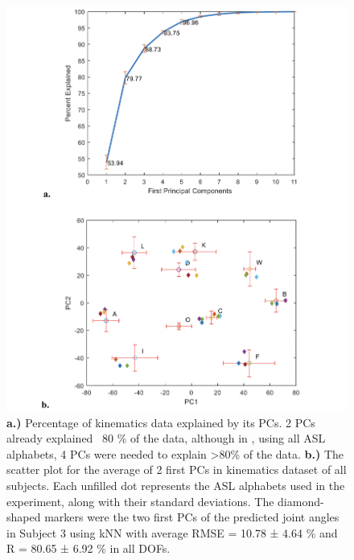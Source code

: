 \documentclass[conference]{IEEEtran}
\begin{document}
\begin{figure}
    \centering
    \includegraphics[width=\columnwidth]{figure5.png}
    \caption{\textbf{a.)} Percentage of kinematics data explained by its PCs. 2 PCs already explained ~80 \% of 
the data, although in \cite{b28}, using all ASL alphabets, 4 PCs were needed to explain >80\% of the data. 
\textbf{b.)} The scatter plot for the average of 2 first PCs in kinematics dataset of all subjects. Each unfilled 
dot represents the ASL alphabets used in the experiment, along with their standard deviations. The 
diamond-shaped markers were the two first PCs of the predicted joint angles in Subject 3 using kNN 
with average RMSE = 10.78 ± 4.64 \% and R = 80.65 ± 6.92 \% in all DOFs.}
    \label{figure5}
\end{figure}
\end{document}
